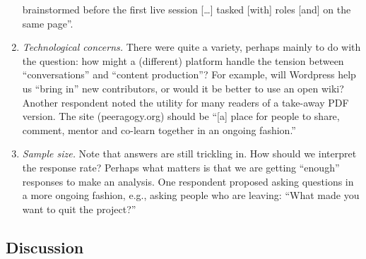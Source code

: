 \begin{enumerate}
  brainstormed before the first live session {[}\ldots{}{]} tasked
  {[}with{]} roles {[}and{]} on the same page''.
\item
  \emph{Technological concerns.} There were quite a variety, perhaps
  mainly to do with the question: how might a (different) platform
  handle the tension between ``conversations'' and ``content
  production''? For example, will Wordpress help us ``bring in'' new
  contributors, or would it be better to use an open wiki? Another
  respondent noted the utility for many readers of a take-away PDF
  version. The site (peeragogy.org) should be ``{[}a{]} place for people
  to share, comment, mentor and co-learn together in an ongoing
  fashion.''
\item
  \emph{Sample size.} Note that answers are still trickling in. How
  should we interpret the response rate? Perhaps what matters is that we
  are getting ``enough'' responses to make an analysis. One respondent
  proposed asking questions in a more ongoing fashion, e.g., asking
  people who are leaving: ``What made you want to quit the project?''
\end{enumerate}

\subsection{Discussion}




